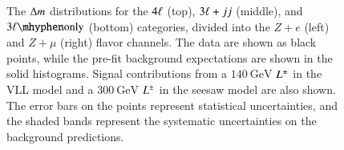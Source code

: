\begin{figure}[htbp]
{	}
	\hfill
	\caption{The $\Delta m$ distributions for the $4\ell$ (top), $3\ell+jj$ (middle), and $\threelo$ (bottom) categories, divided into the $Z+e$ (left) and $Z+\mu$ (right) flavor channels. The data are shown as black points, while the pre-fit background expectations are shown in the solid histograms. Signal contributions from a $\SI{140}{\giga\electronvolt}$ $L^{\pm}$ in the VLL model and a $\SI{300}{\giga\electronvolt}$ $L^{\pm}$ in the seesaw model are also shown. The error bars on the points represent statistical uncertainties, and the shaded bands represent the systematic uncertainties on the background predictions.}
	\label{fig:SR-DeltaM}
\end{figure}

\begin{table}[h]
	\renewcommand{\arraystretch}{1.5}
	\centering
	\footnotesize
\end{table}
